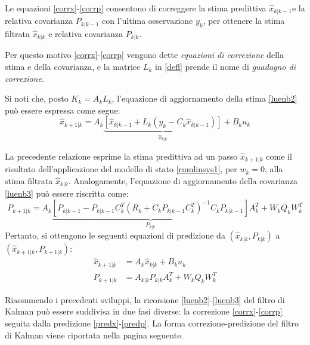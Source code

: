 Le equazioni \eqref{corrx}-\eqref{corrp} consentono di correggere la stima predittiva $\hat{x}_{k|k-1} $e la relativa covarianza $P_{k|k-1} $ con l’ultima osservazione $y_k $, per ottenere la stima filtrata $\hat{x}_{k|k} $ e relativa covarianza $P_{k|k} $.

Per questo motivo \eqref{corrx}-\eqref{corrp} vengono dette \textit{equazioni di correzione} della stima e della covarianza, e la matrice $L_k$ in \eqref{defl} prende il nome di \textit{guadagno di correzione}.

Si noti che, posto $K_k=A_kL_k $, l’equazione di aggiornamento della stima \eqref{luenb2} può essere espressa come segue:
\begin{equation}
\hat{x}_{k+1|k}=A_k\underbrace{[\hat{x}_{k|k-1}+L_k(y_k-C_k\hat{x}_{k|k-1})]}_{\hat{x}_{k|k}}+B_ku_k
\end{equation}

La precedente relazione esprime la stima predittiva ad un passo $\hat{x}_{k+1|k} $ come il risultato dell’applicazione del modello di stato \eqref{rumlinsys1}, per $w_k=0 $, alla stima filtrata $\hat{x}_{k|k}$.
Analogamente, l’equazione di aggiornamento della covarianza \eqref{luenb3} può essere riscritta come:
\begin{equation}
P_{k+1|k}=A_k\underbrace{[P_{k|k-1}-P_{k|k-1}C_k^T(R_k+C_kP_{k|k-1}C_k^T)^{-1}C_kP_{k|k-1}]}_{P_{k|k}}A_k^T+W_kQ_kW_k^T
\end{equation}
Pertanto, si ottengono le seguenti equazioni di predizione da $(\hat{x}_{k|k},P_{k|k})$ a $(\hat{x}_{k+1|k},P_{k+1|k})$:
\begin{align}
\label{predx}
\hat{x}_{k+1|k}&=A_k\hat{x}_{k|k}+B_ku_k\\
\label{predp}
P_{k+1|k}&=A_{k|k}P_{k|k}A_k^T+W_kQ_kW_k^T
\end{align}

Riassumendo i precedenti sviluppi, la ricorsione \eqref{luenb2}-\eqref{luenb3} del filtro di Kalman può essere suddivisa in due fasi diverse: la correzione \eqref{corrx}-\eqref{corrp} seguita dalla predizione \eqref{predx}-\eqref{predp}. La forma correzione-predizione del filtro di Kalman viene riportata nella pagina seguente.
\newpage


